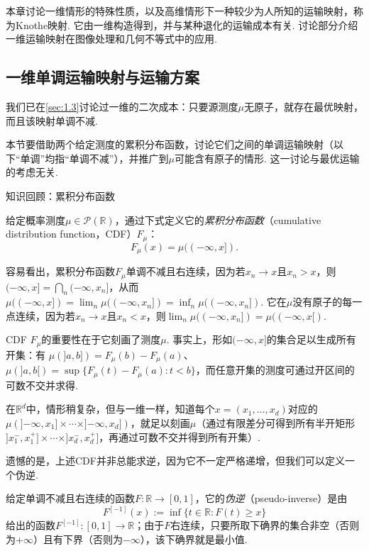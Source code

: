 本章讨论一维情形的特殊性质，以及高维情形下一种较少为人所知的运输映射，称为Knothe映射. 它由一维构造得到，并与某种退化的运输成本有关. 讨论部分介绍一维运输映射在图像处理和几何不等式中的应用.

\subsection{一维单调运输映射与运输方案}\label{sec:2.1}

我们已在\autoref{sec:1.3}讨论过一维的二次成本：只要源测度$\mu$无原子，就存在最优映射，而且该映射单调不减.

本节要借助两个给定测度的累积分布函数，讨论它们之间的单调运输映射（以下“单调”均指“单调不减”），并推广到$\mu$可能含有原子的情形. 这一讨论与最优运输的考虑无关.

\begin{sourcebox}{知识回顾：累积分布函数}\label{box:2.1}
\begin{definition*}
给定概率测度$\mu\in\mathscr P(\mathbb R)$，通过下式定义它的\emph{累积分布函数}（cumulative distribution function，CDF）$F_\mu$：
\[
F_\mu(x)=\mu(({-\infty},x]).
\]
\end{definition*}
容易看出，累积分布函数$F_\mu$单调不减且右连续，因为若$x_n\to x$且$x_n>x$，则$({-\infty},x]=\bigcap_n({-\infty},x_n]$，从而
$\mu(({-\infty},x])=\lim_n\mu(({-\infty},x_n])=\inf_n\mu(({-\infty},x_n])$.
它在$\mu$没有原子的每一点连续，因为若$x_n\to x$且$x_n<x$，则$\lim_n\mu(({-\infty},x_n])=\mu(({-\infty},x[)$.

CDF $F_\mu$的重要性在于它刻画了测度$\mu$. 事实上，形如$({-\infty},x]$的集合足以生成所有开集：有
$\mu(]a,b])=F_\mu(b)-F_\mu(a)$、
$\mu(]a,b[)=\sup\{F_\mu(t)-F_\mu(a):t<b\}$，而任意开集的测度可通过开区间的可数不交并求得.

在$\mathbb R^d$中，情形稍复杂，但与一维一样，知道每个$x=(x_1,\ldots,x_d)$对应的
$\mu(]{-\infty},x_1]\times\cdots\times]{-\infty},x_d])$，就足以刻画$\mu$（通过有限差分可得到所有半开矩形$]x_1^-,x_1^+]\times\cdots\times]x_d^-,x_d^+]$，再通过可数不交并得到所有开集）.
\end{sourcebox}

遗憾的是，上述CDF并非总能求逆，因为它不一定严格递增，但我们可以定义一个伪逆.

\begin{definition}\label{obj:2.1}
给定单调不减且右连续的函数$F:\mathbb R\to[0,1]$，它的\emph{伪逆}（pseudo-inverse）是由
\[
F^{[-1]}(x):=\inf\{t\in\mathbb R:F(t)\ge x\}
\]
给出的函数$F^{[-1]}:[0,1]\to\mathbb R$；由于$F$右连续，只要所取下确界的集合非空（否则为$+\infty$）且有下界（否则为$-\infty$），该下确界就是最小值.
\end{definition}

